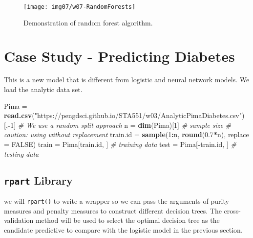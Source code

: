 \documentclass[
]{book}
\newenvironment{Shaded}{\begin{snugshade}}{\end{snugshade}}
\newcommand{\AttributeTok}[1]{\textcolor[rgb]{0.13,0.29,0.53}{#1}}
\newcommand{\CommentTok}[1]{\textcolor[rgb]{0.56,0.35,0.01}{\textit{#1}}}
\newcommand{\ConstantTok}[1]{\textcolor[rgb]{0.56,0.35,0.01}{#1}}
\newcommand{\DecValTok}[1]{\textcolor[rgb]{0.00,0.00,0.81}{#1}}
\newcommand{\FloatTok}[1]{\textcolor[rgb]{0.00,0.00,0.81}{#1}}
\newcommand{\FunctionTok}[1]{\textcolor[rgb]{0.13,0.29,0.53}{\textbf{#1}}}
\newcommand{\NormalTok}[1]{#1}
\newcommand{\OtherTok}[1]{\textcolor[rgb]{0.56,0.35,0.01}{#1}}
\newcommand{\SpecialCharTok}[1]{\textcolor[rgb]{0.81,0.36,0.00}{\textbf{#1}}}
\newcommand{\StringTok}[1]{\textcolor[rgb]{0.31,0.60,0.02}{#1}}
\begin{document}
\begin{figure}

{\centering \texttt{[image: img07/w07-RandomForests]} 

}

\caption{Demonstration of random forest algorithm.}\label{fig:unnamed-chunk-179}
\end{figure}

\hypertarget{case-study---predicting-diabetes}{%
\section{Case Study - Predicting Diabetes}\label{case-study---predicting-diabetes}}

This is a new model that is different from logistic and neural network models. We load the analytic data set.

\begin{Shaded}
\begin{Highlighting}[]
\NormalTok{Pima }\OtherTok{=} \FunctionTok{read.csv}\NormalTok{(}\StringTok{"https://pengdsci.github.io/STA551/w03/AnalyticPimaDiabetes.csv"}\NormalTok{)[,}\SpecialCharTok{{-}}\DecValTok{1}\NormalTok{]}
\CommentTok{\# We use a random split approach}
\NormalTok{n }\OtherTok{=} \FunctionTok{dim}\NormalTok{(Pima)[}\DecValTok{1}\NormalTok{]  }\CommentTok{\# sample size}
\CommentTok{\# caution: using without replacement}
\NormalTok{train.id }\OtherTok{=} \FunctionTok{sample}\NormalTok{(}\DecValTok{1}\SpecialCharTok{:}\NormalTok{n, }\FunctionTok{round}\NormalTok{(}\FloatTok{0.7}\SpecialCharTok{*}\NormalTok{n), }\AttributeTok{replace =} \ConstantTok{FALSE}\NormalTok{)  }
\NormalTok{train }\OtherTok{=}\NormalTok{ Pima[train.id, ]    }\CommentTok{\# training data}
\NormalTok{test }\OtherTok{=}\NormalTok{ Pima[}\SpecialCharTok{{-}}\NormalTok{train.id, ]    }\CommentTok{\# testing data}
\end{Highlighting}
\end{Shaded}

\hypertarget{rpart-library}{%
\subsection{\texorpdfstring{\texttt{rpart} Library}{rpart Library}}\label{rpart-library}}

we will \texttt{rpart()} to write a wrapper so we can pass the arguments of purity measures and penalty measures to construct different decision trees. The cross-validation method will be used to select the optimal decision tree as the candidate predictive to compare with the logistic model in the previous section.
\end{document}

